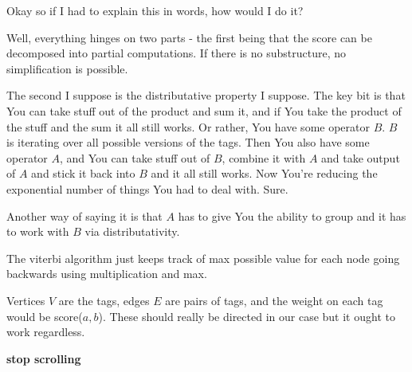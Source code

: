 \documentclass{article}
\begin{document}
	Okay so if I had to explain this in words, how would I do it?
	
	Well, everything hinges on two parts - the first being that the score can be decomposed into partial computations. If there is no substructure, no simplification is possible. 
	
	The second I suppose is the distributative property I suppose. The key bit is that You can take stuff out of the product and sum it, and if You take the product of the stuff and the sum it all still works. Or rather, You have some operator $B$. $B$ is iterating over all possible versions of the tags. Then You also have some operator $A$, and You can take stuff out of $B$, combine it with $A$ and take output of $A$ and stick it back into $B$ and it all still works. Now You're reducing the exponential number of things You had to deal with. Sure.
	
	Another way of saying it is that $A$ has to give You the ability to group and it has to work with $B$ via distributativity.
	
	The viterbi algorithm just keeps track of max possible value for each node going backwards using multiplication and max. 
	
	Vertices $V$ are the tags, edges $E$ are pairs of tags, and the weight on each tag would be score($a, b$). These should really be directed in our case but it ought to work regardless.
	
	\textbf{stop scrolling}
	
\end{document}

